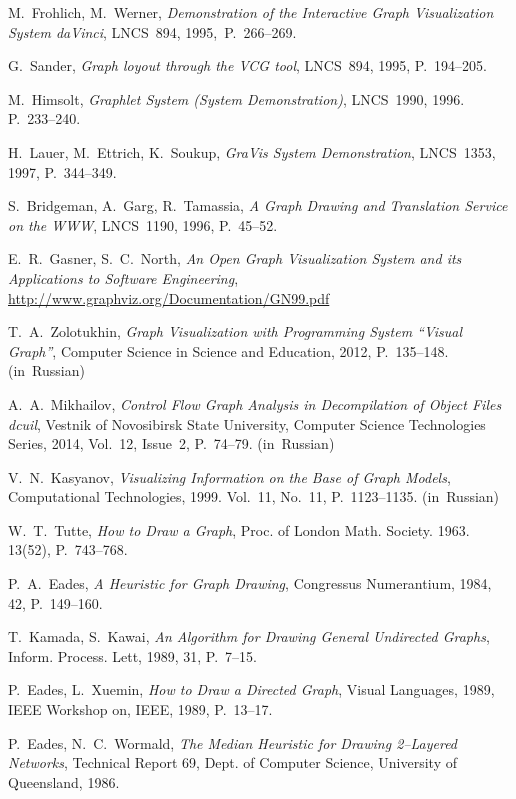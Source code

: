 \documentclass[conference]{IEEEtran}
\begin{document}
\begin{thebibliography}{9}

 M.~Frohlich, M.~Werner, \emph{Demonstration of the Interactive Graph Visualization System daVinci}, LNCS~894, 1995,~P.~266--269.

 G.~Sander, \emph{Graph loyout through the VCG tool}, LNCS~894, 1995, P.~194--205.

 M.~Himsolt, \emph{Graphlet System (System Demonstration)}, LNCS~1990, 1996. P.~233--240.

 H.~Lauer, M.~Ettrich, K.~Soukup, \emph{GraVis System Demonstration}, LNCS~1353, 1997, P.~344--349.

 S.~Bridgeman, A.~Garg, R.~Tamassia, \emph{A Graph Drawing and Translation Service on the WWW}, LNCS~1190, 1996, P.~45--52.

 E.~R.~Gasner, S.~C.~North, \emph{An Open Graph Visualization System and its Applications to Software Engineering}, \url{http://www.graphviz.org/Documentation/GN99.pdf}

 T.~A.~Zolotukhin, \emph{Graph Visualization with Programming System ``Visual Graph''}, Computer Science in Science and Education, 2012, P.~135--148. (in~Russian)

 A.~A.~Mikhailov, \emph{Control Flow Graph Analysis in Decompilation of Object Files dcuil}, Vestnik of Novosibirsk State University, Computer Science Technologies Series, 2014, Vol.~12, Issue~2, P.~74--79. (in~Russian)

 V.~N.~Kasyanov, \emph{Visualizing Information on the Base of Graph Models}, Computational Technologies, 1999. Vol.~11, No.~11, P.~1123--1135. (in~Russian)

 W.~T.~Tutte, \emph{How to Draw a Graph}, Proc. of London Math. Society. 1963. 13(52),  P.~743--768.

 P.~A.~Eades, \emph{A Heuristic for Graph Drawing}, Congressus Numerantium, 1984, 42,  P.~149--160.

 T.~Kamada, S.~Kawai, \emph{An Algorithm for Drawing General Undirected Graphs}, Inform. Process. Lett, 1989, 31, P.~7--15.

 P.~Eades, L.~Xuemin, \emph{How to Draw a Directed Graph}, Visual Languages, 1989, IEEE Workshop on, IEEE, 1989, P.~13--17.

 P.~Eades, N.~C.~Wormald, \emph{The Median Heuristic for Drawing 2--Layered Networks}, Technical Report 69, Dept. of Computer Science, University of Queensland, 1986.


\end{thebibliography}
\end{document}
